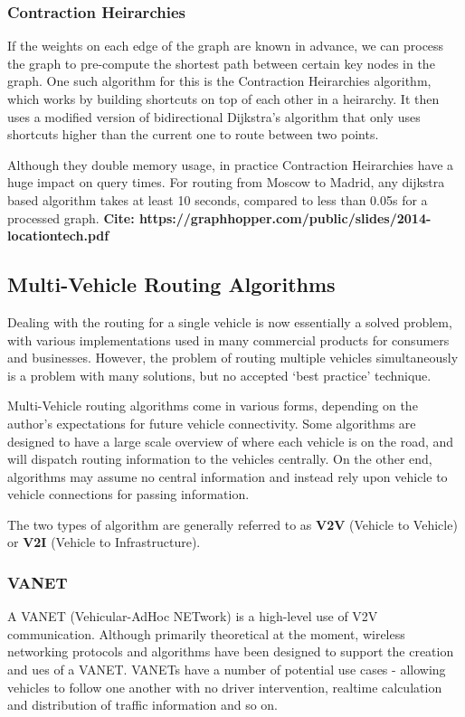 \documentclass[ %
                    author={Alexander Hill},
                supervisor={Dr. Benjamin Sach},
                    degree={MEng},
                     title={MARMOSET},
                  subtitle={Multi-Agent Route Management using Online Simulation for Efficient Transportation},
                      type={research},
                      year={2016} ]{dissertation}
\begin{document}
\subsubsection{Contraction Heirarchies}

If the weights on each edge of the graph are known in advance, we can process
the graph to pre-compute the shortest path between certain key nodes in the
graph. One such algorithm for this is the Contraction Heirarchies algorithm,
which works by building shortcuts on top of each other in a heirarchy. It then
uses a modified version of bidirectional Dijkstra's algorithm that only uses
shortcuts higher than the current one to route between two points.

Although they double memory usage, in practice Contraction Heirarchies have a
huge impact on query times. For routing from Moscow to Madrid, any dijkstra based algorithm
takes at least 10 seconds, compared to less than 0.05s for a processed graph.
\textbf{Cite: https://graphhopper.com/public/slides/2014-locationtech.pdf}

\subsection{Multi-Vehicle Routing Algorithms}

Dealing with the routing for a single vehicle is now essentially a solved
problem, with various implementations used in many commercial products for
consumers and businesses. However, the problem of routing multiple vehicles
simultaneously is a problem with many solutions, but no accepted `best practice'
technique.

Multi-Vehicle routing algorithms come in various forms, depending on the
author's expectations for future vehicle connectivity. Some algorithms are
designed to have a large scale overview of where each vehicle is on the road,
and will dispatch routing information to the vehicles centrally. On the other
end, algorithms may assume no central information and instead rely upon vehicle
to vehicle connections for passing information.

The two types of algorithm are generally referred to as \textbf{V2V} (Vehicle to
Vehicle) or \textbf{V2I} (Vehicle to Infrastructure).

\subsubsection{VANET}

A VANET (Vehicular-AdHoc NETwork) is a high-level use of V2V communication.
Although primarily theoretical at the moment, wireless networking protocols and
algorithms have been designed to support the creation and ues of a VANET. VANETs
have a number of potential use cases - allowing vehicles to follow one another
with no driver intervention, realtime calculation and distribution of traffic
information and so on.
\end{document}
